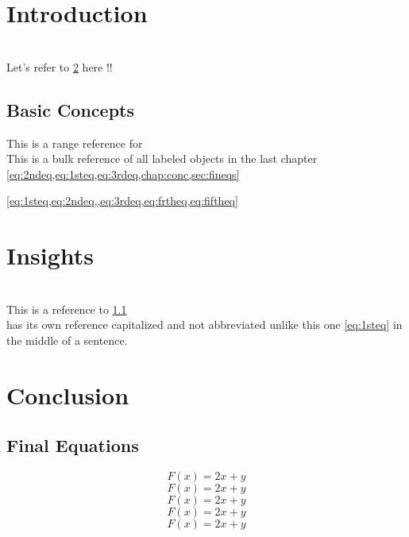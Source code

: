 \documentclass{book}
\begin{document}
	\chapter{Introduction}
	\label{chap:intro}
	\lipsum[1] \\
	
	Let's refer to \cref*{chap:ins} here !!
	
	\section{Basic Concepts}
	\label{sec:basicons}
	This is a range reference for 
	 \\
	
	This is a bulk reference of all labeled objects
	in the last chapter
\cref{eq:2ndeq,eq:1steq,eq:3rdeq,chap:conc,sec:fineqs}

\cref{eq:1steq,eq:2ndeq,,eq:3rdeq,eq:frtheq,eq:fiftheq}
	
	\chapter{Insights}
	\label{chap:ins}
	\lipsum[1] \\
	
	This is a reference to \cref{sec:basicons} \\
	
	 has its own reference capitalized
	and not abbreviated unlike this one
	\cref{eq:1steq} in the middle of a sentence.
	
	\chapter{Conclusion}
	\label{chap:conc}
	\lipsum[1] 
	
	\section{Final Equations}
	\label{sec:fineqs}
	
	\begin{equation}
		F(x) = 2x + y
		\label{eq:1steq}
	\end{equation}
	\begin{equation}
		F(x) = 2x + y
		\label{eq:2ndeq}
	\end{equation}
	\begin{equation}
		F(x) = 2x + y
		\label{eq:3rdeq}
	\end{equation}
	\begin{equation}
		F(x) = 2x + y
		\label{eq:frtheq}
	\end{equation}
	\begin{equation}
		F(x) = 2x + y
		\label{eq:fiftheq}
	\end{equation}
\end{document}
